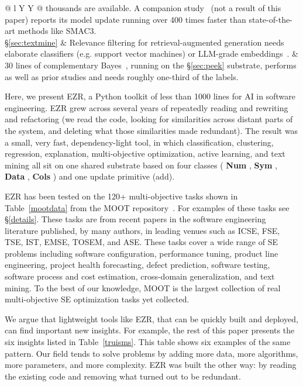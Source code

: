 \documentclass[AMA,STIX2COL]{WileyNJDv5}
\newcommand{\NEW}[1]{\textcolor{newblue}{#1}}
\newcommand{\IT}{{\sffamily EZR}}
\newcommand{\cls}[1]{%
  \setlength{\fboxsep}{1.5pt}%
  \colorbox{clsbg}{\sffamily\bfseries{#1}}%
}
\begin{document}
\begin{table}
{\begin{center}
\begin{tabularx}{\textwidth}{@{} l Y Y @{}}
thousands are available.
\NEW{A companion study~\cite{ganguly2026lowgodatalightse}
(not a result of this paper) reports its model update running
over 400 times faster than state-of-the-art methods like
SMAC3.} \\
\midrule
\S\ref{sec:textmine} &
Relevance filtering for retrieval-augmented generation needs
elaborate classifiers (e.g. support
vector machines) or 
LLM-grade embeddings~\cite{yu2018total,yu2018finding}. &
30 lines of complementary Bayes~\cite{rennie2003tackling},
running on the
\S\ref{sec:peek} substrate,
performs as well as prior studies
and needs roughly
one-third of the labels.\\
\bottomrule
\end{tabularx}
\end{center}}
\end{table}


Here, we present \IT{}, a \NEW{Python toolkit of less than
1000 lines} for
AI in software engineering. \IT{} grew across several years of
repeatedly reading and rewriting and refactoring (we read the
code, looking for similarities across distant parts of the
system, and deleting what those similarities made redundant).
The result was a small, very fast, dependency-light tool, in
which classification, clustering,  regression, explanation, multi-objective
optimization,
active learning, and text mining all sit on one shared substrate
based on four classes (\cls{Num}, \cls{Sym}, \cls{Data}, \cls{Cols}) and one
update primitive (\textsf{add}).

\IT{} has been tested on the 120+ multi-objective tasks shown in
Table~\ref{mootdata} from the MOOT
repository~\cite{menzies2025moot}. For examples of these tasks
see \S\ref{details}. These
tasks are from recent papers in the software engineering
literature published, by many authors, in leading venues such as
ICSE, FSE, TSE, IST, EMSE, TOSEM, and ASE. These tasks cover a
wide range of SE problems including software configuration,
performance tuning, product line engineering, project health
forecasting, defect prediction, software testing, software
process and cost estimation, cross-domain generalization, and
text mining. To the best of our knowledge, MOOT is the largest
collection of real multi-objective SE optimization tasks yet
collected.


We argue that lightweight tools
like EZR, that can be quickly built and deployed,  can find important new insights.
For example,
the rest of this paper presents the six insights listed in Table~\ref{truisms}.
This table shows six examples
of the same pattern.   Our field tends to
solve problems by adding more data, more algorithms, more
parameters, and more complexity. EZR was built the other way:
by reading the existing code and removing what
turned out to be redundant.
\end{document}
